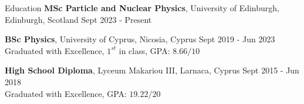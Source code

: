 \documentclass{resume} %
\begin{document}
        \begin{rSection}{Education}
                {\bf MSc Particle and Nuclear Physics}, University of Edinburgh, Edinburgh, Scotland \hfill {Sept 2023 - Present}
                
                {\bf BSc Physics}, University of Cyprus, Nicosia, Cyprus \hfill {Sept 2019 - Jun 2023}\\
                Graduated with Excellence, $1^{st}$ in class, GPA: $8.66/10$
                
                {\bf High School Diploma}, Lyceum Makariou III, Larnaca, Cyprus \hfill {Sept 2015 - Jun 2018}\\
        Graduated with Excellence, GPA: $19.22/20$
        \end{rSection}

        \bigbreak
\end{document}
